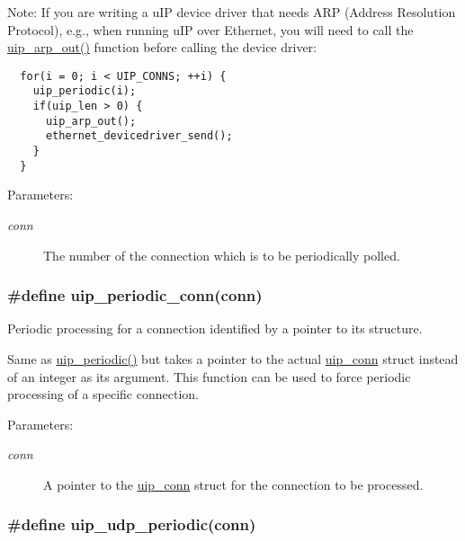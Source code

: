 \begin{Desc}
\item[Note:]If you are writing a u\-IP device driver that needs ARP (Address Resolution Protocol), e.g., when running u\-IP over Ethernet, you will need to call the \hyperlink{a00067_g54b27e45df15e10a0eb1a3e3a91417d2}{uip\_\-arp\_\-out()} function before calling the device driver: 

\footnotesize\begin{verbatim}  for(i = 0; i < UIP_CONNS; ++i) {
    uip_periodic(i);
    if(uip_len > 0) {
      uip_arp_out();
      ethernet_devicedriver_send();
    }
  }
\end{verbatim}
\normalsize
\end{Desc}
\begin{Desc}
\item[Parameters:]
\begin{description}
\item[{\em conn}]The number of the connection which is to be periodically polled. \end{description}
\end{Desc}
\hypertarget{a00063_gbaf0bb2b6a4424b4eb69e45e457c2583}{
\subsubsection[uip\_\-periodic\_\-conn]{\setlength{\rightskip}{0pt plus 5cm}\#define uip\_\-periodic\_\-conn(conn)}}
\label{a00063_gbaf0bb2b6a4424b4eb69e45e457c2583}


Periodic processing for a connection identified by a pointer to its structure. 

Same as \hyperlink{a00063_g1024f8a5fa65e82bf848b2e6590d9628}{uip\_\-periodic()} but takes a pointer to the actual \hyperlink{a00028}{uip\_\-conn} struct instead of an integer as its argument. This function can be used to force periodic processing of a specific connection.

\begin{Desc}
\item[Parameters:]
\begin{description}
\item[{\em conn}]A pointer to the \hyperlink{a00028}{uip\_\-conn} struct for the connection to be processed. \end{description}
\end{Desc}
\hypertarget{a00063_g2c64c8c36bc84f9336f6a2184ea51883}{
\subsubsection[uip\_\-udp\_\-periodic]{\setlength{\rightskip}{0pt plus 5cm}\#define uip\_\-udp\_\-periodic(conn)}}
\label{a00063_g2c64c8c36bc84f9336f6a2184ea51883}


